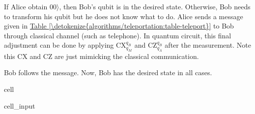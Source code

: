 \documentclass[letterpaper,10pt,english]{jupyterBook}
\begin{document}
\sphinxAtStartPar
{}

\sphinxAtStartPar
If Alice obtain \(00\rangle\), then Bob’s qubit is in the desired state.  Otherwise, Bob needs to transform his qubit but he does not know what to do.  Alice sends a message given in \hyperref[\detokenize{algorithms/teleportation:table-teleport}]{Table \ref{\detokenize{algorithms/teleportation:table-teleport}}} to Bob through classical channel (such as telephone). In quantum circuit, this final adjustment can be done by applying CX\(_{q_M}^{q_B}\) and CZ\(_{q_A}^{q_B}\) after the measurement.  Note this CX and CZ are just mimicking the classical communication.

\sphinxAtStartPar
Bob follows the message.  Now, Bob has the desired state in all cases.

\begin{sphinxuseclass}{cell}\begin{sphinxVerbatimInput}

\begin{sphinxuseclass}{cell_input}
\begin{sphinxVerbatim}[commandchars=\\\{\}]
   
      
     
  




\end{sphinxVerbatim}
\end{sphinxuseclass}
\end{sphinxVerbatimInput}
\end{sphinxuseclass}
\end{document}
